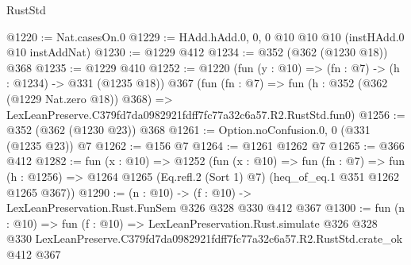 \begin{lexlean}{RustStd}
\begin{coremodule}
@1220 := Nat.casesOn.{0}
@1229 := HAdd.hAdd.{0, 0, 0} @10 @10 @10 (instHAdd.{0} @10 instAddNat)
@1230 := @1229 @412
@1234 := @352 (@362 (@1230 @18)) @368
@1235 := @1229 @410
@1252 := @1220
    (fun (y : @10) => (fn : @7) -> (h : @1234) -> @331 (@1235 @18))
    @367
    (fun (fn : @7) =>
    fun (h : @352 (@362 (@1229 Nat.zero @18)) @368) =>
    LexLeanPreserve.C379fd7da0982921fdff7fc77a32c6a57.R2.RustStd.fun0)
@1256 := @352 (@362 (@1230 @23)) @368
@1261 := Option.noConfusion.{0, 0} (@331 (@1235 @23)) @7
@1262 := @156 @7
@1264 := @1261 @1262 @7
@1265 := @366 @412
@1282 := fun (x : @10) =>
  @1252
    (fun (x : @10) =>
    fun (fn : @7) =>
    fun (h : @1256) => @1264 @1265 (Eq.refl.{2} (Sort 1) @7) (heq_of_eq.{1} @351 @1262 @1265 @367))
@1290 := (n : @10) -> (f : @10) -> LexLeanPreservation.Rust.FunSem @326 @328 @330 @412 @367
@1300 := fun (n : @10) =>
  fun (f : @10) =>
  LexLeanPreservation.Rust.simulate
    @326
    @328
    @330
    LexLeanPreserve.C379fd7da0982921fdff7fc77a32c6a57.R2.RustStd.crate_ok
    @412
    @367
\end{coremodule}
\end{lexlean}
